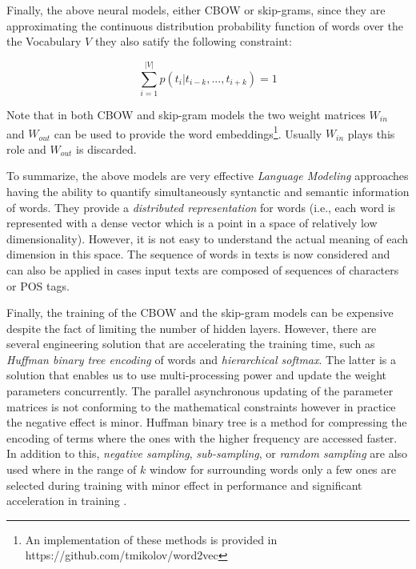 Finally, the above neural models, either CBOW or skip-grams, since they are approximating the continuous distribution probability function of words over the the Vocabulary $V$ they also satify the following constraint:

\begin{equation} \label{chap:word_embeddings:eq:nnet_condtraint}
	\sum_{i=1}^{|V|}{p(t_{i}|t_{i-k}, ... ,t_{i+k})} = 1
\end{equation}

Note that in both CBOW and skip-gram models the two weight matrices $W_{in}$ and $W_{out}$ can be used to provide the word embeddings\footnote{An implementation of these methods is provided in https://github.com/tmikolov/word2vec}. Usually $W_{in}$ plays this role and $W_{out}$ is discarded.


To summarize, the above models are very effective \textit{Language Modeling} approaches having the ability to quantify simultaneously syntanctic and semantic information of words. They provide a \textit{distributed representation} for words (i.e., each word is represented with a dense vector which is a point in a space of relatively low dimensionality). However, it is not easy to understand the actual meaning of each dimension in this space. The sequence of words in texts is now considered and can also be applied in cases input texts are composed of sequences of characters or POS tags.

Finally, the training of the CBOW and the skip-gram models can be expensive despite the fact of limiting the number of hidden layers. However, there are several engineering solution that are accelerating the training time, such as \textit{Huffman binary tree encoding} of words and \textit{hierarchical softmax}. The latter is a solution that enables us to use multi-processing power and update the weight parameters concurrently. The parallel asynchronous updating of the parameter matrices is not conforming to the mathematical constraints however in practice the negative effect is minor. Huffman binary tree is a method for compressing the encoding of terms where the ones with the higher frequency are accessed faster. In addition to this, \textit{negative sampling}, \textit{sub-sampling}, or \textit{ramdom sampling} are also used where in the range of $k$ window for surrounding words only a few ones are selected during training with minor effect in  performance and significant acceleration in training . 


